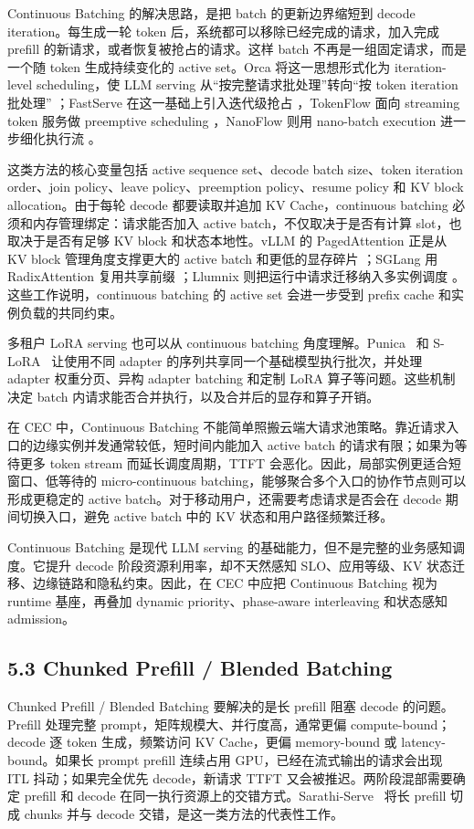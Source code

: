 Continuous Batching 的解决思路，是把 batch 的更新边界缩短到 decode iteration。每生成一轮 token 后，系统都可以移除已经完成的请求，加入完成 prefill 的新请求，或者恢复被抢占的请求。这样 batch 不再是一组固定请求，而是一个随 token 生成持续变化的 active set。Orca 将这一思想形式化为 iteration-level scheduling，使 LLM serving 从“按完整请求批处理”转向“按 token iteration 批处理” \cite{yu2022orca}；FastServe 在这一基础上引入迭代级抢占 \cite{wu2026fastserve}，TokenFlow 面向 streaming token 服务做 preemptive scheduling \cite{chen2026tokenflow}，NanoFlow 则用 nano-batch execution 进一步细化执行流 \cite{zhu2025nanoflow}。

这类方法的核心变量包括 active sequence set、decode batch size、token iteration order、join policy、leave policy、preemption policy、resume policy 和 KV block allocation。由于每轮 decode 都要读取并追加 KV Cache，continuous batching 必须和内存管理绑定：请求能否加入 active batch，不仅取决于是否有计算 slot，也取决于是否有足够 KV block 和状态本地性。vLLM 的 PagedAttention 正是从 KV block 管理角度支撑更大的 active batch 和更低的显存碎片 \cite{kwon2023efficient}；SGLang 用 RadixAttention 复用共享前缀 \cite{zheng2024sglang}；Llumnix 则把运行中请求迁移纳入多实例调度 \cite{sun2024llumnix}。这些工作说明，continuous batching 的 active set 会进一步受到 prefix cache 和实例负载的共同约束。

多租户 LoRA serving 也可以从 continuous batching 角度理解。Punica~\cite{chen2024punica} 和 S-LoRA~\cite{sheng2024slora} 让使用不同 adapter 的序列共享同一个基础模型执行批次，并处理 adapter 权重分页、异构 adapter batching 和定制 LoRA 算子等问题。这些机制决定 batch 内请求能否合并执行，以及合并后的显存和算子开销。

在 CEC 中，Continuous Batching 不能简单照搬云端大请求池策略。靠近请求入口的边缘实例并发通常较低，短时间内能加入 active batch 的请求有限；如果为等待更多 token stream 而延长调度周期，TTFT 会恶化。因此，局部实例更适合短窗口、低等待的 micro-continuous batching，能够聚合多个入口的协作节点则可以形成更稳定的 active batch。对于移动用户，还需要考虑请求是否会在 decode 期间切换入口，避免 active batch 中的 KV 状态和用户路径频繁迁移。

Continuous Batching 是现代 LLM serving 的基础能力，但不是完整的业务感知调度。它提升 decode 阶段资源利用率，却不天然感知 SLO、应用等级、KV 状态迁移、边缘链路和隐私约束。因此，在 CEC 中应把 Continuous Batching 视为 runtime 基座，再叠加 dynamic priority、phase-aware interleaving 和状态感知 admission。
\subsection*{5.3 Chunked Prefill / Blended Batching}
Chunked Prefill / Blended Batching 要解决的是长 prefill 阻塞 decode 的问题。Prefill 处理完整 prompt，矩阵规模大、并行度高，通常更偏 compute-bound；decode 逐 token 生成，频繁访问 KV Cache，更偏 memory-bound 或 latency-bound。如果长 prompt prefill 连续占用 GPU，已经在流式输出的请求会出现 ITL 抖动；如果完全优先 decode，新请求 TTFT 又会被推迟。两阶段混部需要确定 prefill 和 decode 在同一执行资源上的交错方式。Sarathi-Serve~\cite{agrawal2024taming} 将长 prefill 切成 chunks 并与 decode 交错，是这一类方法的代表性工作。

